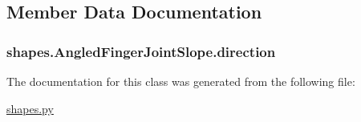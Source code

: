 \subsection{Member Data Documentation}
\hypertarget{classshapes_1_1_angled_finger_joint_slope_aec9e488a6e295ae2ccee1d23a1d21a88}{}
\subsubsection[{direction}]{\setlength{\rightskip}{0pt plus 5cm}shapes.\+Angled\+Finger\+Joint\+Slope.\+direction}\label{classshapes_1_1_angled_finger_joint_slope_aec9e488a6e295ae2ccee1d23a1d21a88}


The documentation for this class was generated from the following file\+:\begin{DoxyCompactItemize}
\item 
\hyperlink{shapes_8py}{shapes.\+py}\end{DoxyCompactItemize}
